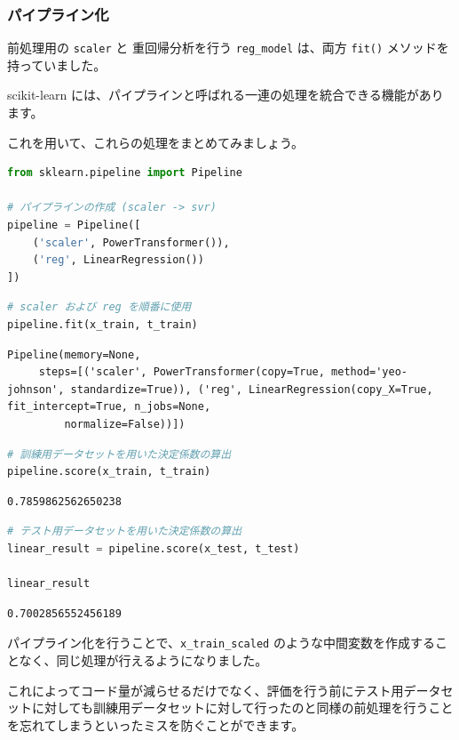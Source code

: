 \subsubsection{パイプライン化}


前処理用の \texttt{scaler} と 重回帰分析を行う \texttt{reg\_model} は、両方 \texttt{fit()} メソッドを持っていました。

scikit-learn には、パイプラインと呼ばれる一連の処理を統合できる機能があります。

これを用いて、これらの処理をまとめてみましょう。


\begin{lstlisting}[style=codecell,language=Python]
from sklearn.pipeline import Pipeline

# パイプラインの作成 (scaler -> svr)
pipeline = Pipeline([
    ('scaler', PowerTransformer()),
    ('reg', LinearRegression())
])
\end{lstlisting}

\begin{lstlisting}[style=codecell,language=Python]
# scaler および reg を順番に使用
pipeline.fit(x_train, t_train)
\end{lstlisting}

\begin{lstlisting}[style=outputcell]
Pipeline(memory=None,
     steps=[('scaler', PowerTransformer(copy=True, method='yeo-johnson', standardize=True)), ('reg', LinearRegression(copy_X=True, fit_intercept=True, n_jobs=None,
         normalize=False))])
\end{lstlisting}

\begin{lstlisting}[style=codecell,language=Python]
# 訓練用データセットを用いた決定係数の算出
pipeline.score(x_train, t_train)
\end{lstlisting}

\begin{lstlisting}[style=outputcell]
0.7859862562650238
\end{lstlisting}

\begin{lstlisting}[style=codecell,language=Python]
# テスト用データセットを用いた決定係数の算出
linear_result = pipeline.score(x_test, t_test)

linear_result
\end{lstlisting}

\begin{lstlisting}[style=outputcell]
0.7002856552456189
\end{lstlisting}

パイプライン化を行うことで、\texttt{x\_train\_scaled} のような中間変数を作成することなく、同じ処理が行えるようになりました。

これによってコード量が減らせるだけでなく、評価を行う前にテスト用データセットに対しても訓練用データセットに対して行ったのと同様の前処理を行うことを忘れてしまうといったミスを防ぐことができます。
